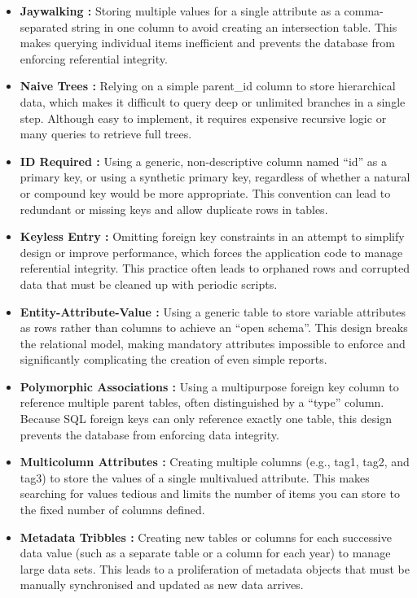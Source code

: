 \begin{itemize}
    \item \textbf{Jaywalking :} Storing multiple values for a single attribute as a comma-separated string in one column to avoid creating an intersection table. This makes querying individual items inefficient and prevents the database from enforcing referential integrity.
    \item \textbf{Naive Trees :} Relying on a simple parent\_id column to store hierarchical data, which makes it difficult to query deep or unlimited branches in a single step. Although easy to implement, it requires expensive recursive logic or many queries to retrieve full trees.
    \item \textbf{ID Required :} Using a generic, non-descriptive column named “id” as a primary key, or using a synthetic primary key, regardless of whether a natural or compound key would be more appropriate. This convention can lead to redundant or missing keys and allow duplicate rows in tables.
    \item \textbf{Keyless Entry :} Omitting foreign key constraints in an attempt to simplify design or improve performance, which forces the application code to manage referential integrity. This practice often leads to orphaned rows and corrupted data that must be cleaned up with periodic scripts.
    \item \textbf{Entity-Attribute-Value :} Using a generic table to store variable attributes as rows rather than columns to achieve an “open schema”. This design breaks the relational model, making mandatory attributes impossible to enforce and significantly complicating the creation of even simple reports.
    \item \textbf{Polymorphic Associations :} Using a multipurpose foreign key column to reference multiple parent tables, often distinguished by a “type” column. Because SQL foreign keys can only reference exactly one table, this design prevents the database from enforcing data integrity.
    \item \textbf{Multicolumn Attributes :} Creating multiple columns (e.g., tag1, tag2, and tag3) to store the values of a single multivalued attribute. This makes searching for values tedious and limits the number of items you can store to the fixed number of columns defined.
    \item \textbf{Metadata Tribbles :} Creating new tables or columns for each successive data value (such as a separate table or a column for each year) to manage large data sets. This leads to a proliferation of metadata objects that must be manually synchronised and updated as new data arrives.
\end{itemize}

